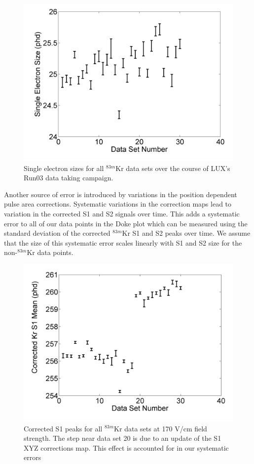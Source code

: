 \documentclass[a4paper,12pt]{article}
\begin{document}
{\begin{figure}[H]
\centering
\includegraphics[scale=0.4]{SESizes.png}
\caption{Single electron sizes for all $^{83m}$Kr data sets over the course of LUX's Run03 data taking campaign.}
\label{SESizes}
\end{figure}


Another source of error is introduced by variations in the position dependent pulse area corrections.  Systematic variations in the correction maps lead to variation in the corrected S1 and S2 signals over time.  This adds a systematic error to all of our data points in the Doke plot which can be measured using the standard deviation of the corrected $^{83m}$Kr S1 and S2 peaks over time.  We assume that the size of this systematic error scales linearly with S1 and S2 size for the non-$^{83m}$Kr data points. 

\begin{figure}[H]
\centering
\includegraphics[scale=0.4]{S1Variation.png}
\caption{Corrected S1 peaks for all $^{83m}$Kr data sets at 170 V/cm field strength.  The step near data set 20 is due to an update of the S1 XYZ corrections map.  This effect is accounted for in our systematic errors}
\label{S1Variation}
\end{figure}


}
\end{document}
